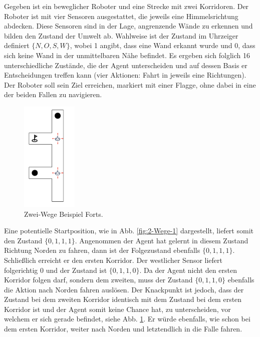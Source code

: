Gegeben ist ein beweglicher Roboter und eine Strecke mit zwei Korridoren. Der Roboter ist mit vier Sensoren ausgestattet, die jeweils eine Himmelsrichtung abdecken. Diese Sensoren sind in der Lage, angrenzende Wände zu erkennen und bilden den Zustand der Umwelt ab. Wahlweise ist der Zustand im Uhrzeiger definiert $\{N, O, S, W\}$, wobei 1 angibt, dass eine Wand erkannt wurde und 0, dass sich keine Wand in der unmittelbaren Nähe befindet. Es ergeben sich folglich 16 unterschiedliche Zustände, die der Agent unterscheiden und auf dessen Basis er Entscheidungen treffen kann (vier Aktionen: Fahrt in jeweils eine Richtungen). Der Roboter soll sein Ziel erreichen, markiert mit einer Flagge, ohne dabei in eine der beiden Fallen zu navigieren.
\par
\begin{figure}
  \begin{center}
  \includegraphics[height=200px]{images/2passagesStart.png}  \end{center}
  \caption{Zwei-Wege Beispiel Forts.}
  \label{fig:2-Wege-2}
\end{figure}

Eine potentielle Startposition, wie in Abb. \ref{fig:2-Wege-1} dargestellt, liefert somit den Zustand $\{0, 1, 1, 1\}$. Angenommen der Agent hat gelernt in diesem Zustand Richtung Norden zu fahren, dann ist der Folgezustand ebenfalls $\{0, 1, 1, 1\}$. Schließlich erreicht er den ersten Korridor. Der westlicher Sensor liefert folgerichtig 0 und der Zustand ist $\{0, 1, 1, 0\}$. Da der Agent nicht den ersten Korridor folgen darf, sondern dem zweiten, muss der Zustand $\{0, 1, 1, 0\}$ ebenfalls die Aktion \glqq nach Norden fahren \grqq{} auslösen. Der Knackpunkt ist jedoch, dass der Zustand bei dem zweiten Korridor identisch mit dem Zustand bei dem ersten Korridor ist und der Agent somit keine Chance hat, zu unterscheiden, vor welchem er sich gerade befindet, siehe Abb. \ref{fig:2-Wege-2}. Er würde ebenfalls, wie schon bei dem ersten Korridor, weiter nach Norden und letztendlich in die Falle fahren.
\par 

